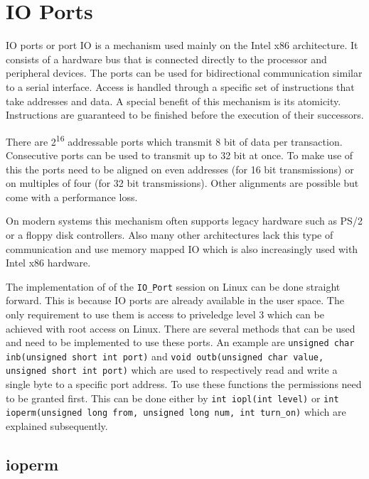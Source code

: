 \documentclass[
a4paper,
12pt,
notitlepage,
parskip=half,
DIV=11,
]{scrbook}
\begin{document}
		\section{IO Ports}
		
		IO ports or port IO is a mechanism used mainly on the Intel x86 architecture.
		It consists of a hardware bus that is connected directly to the processor and peripheral devices.
		The ports can be used for bidirectional communication similar to a serial interface.
		Access is handled through a specific set of instructions that take addresses and data.
		A special benefit of this mechanism is its atomicity.
		Instructions are guaranteed to be finished before the execution of their successors.
		
		There are 2\textsuperscript{16} addressable ports which transmit 8 bit of data per transaction.
		Consecutive ports can be used to transmit up to 32 bit at once.
		To make use of this the ports need to be aligned on even addresses (for 16 bit transmissions) or on multiples of four (for 32 bit transmissions).
		Other alignments are possible but come with a performance loss.
		
		On modern systems this mechanism often supports legacy hardware such as PS/2 or a floppy disk controllers.
		Also many other architectures lack this type of communication and use memory mapped IO which is also increasingly used with Intel x86 hardware.
		\citep{ioports} \citep{intelmanual}
		
		The implementation of of the \texttt{IO\_Port} session on Linux can be done straight forward.
		This is because IO ports are already available in the user space.
		The only requirement to use them is access to priveledge level 3 which can be achieved with root access on Linux.
		There are several methods that can be used and need to be implemented to use these ports.
		An example are \texttt{unsigned char inb(unsigned short int port)} and \texttt{void outb(unsigned char value, unsigned short int port)} which are used to respectively read and write a single byte to a specific port address.
		To use these functions the permissions need to be granted first.
		This can be done either by \texttt{int iopl(int level)} or \texttt{int ioperm(unsigned long from, unsigned long num, int turn\_on)} which are explained subsequently. \citep{outb} \citep{ioperm} \citep{iopl}
		
		\subsection{ioperm}
		
\end{document}
